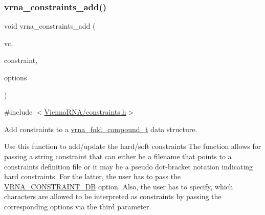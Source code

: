 \subsubsection{\texorpdfstring{vrna\+\_\+constraints\+\_\+add()}{vrna\_constraints\_add()}}
{\footnotesize\ttfamily void vrna\+\_\+constraints\+\_\+add (\begin{DoxyParamCaption}\item[{\mbox{\hyperlink{group__fold__compound_ga1b0cef17fd40466cef5968eaeeff6166}{vrna\+\_\+fold\+\_\+compound\+\_\+t}} $\ast$}]{vc,  }\item[{const char $\ast$}]{constraint,  }\item[{unsigned int}]{options }\end{DoxyParamCaption})}



{\ttfamily \#include $<$\mbox{\hyperlink{constraints_8h}{Vienna\+R\+N\+A/constraints.\+h}}$>$}



Add constraints to a \mbox{\hyperlink{group__fold__compound_ga1b0cef17fd40466cef5968eaeeff6166}{vrna\+\_\+fold\+\_\+compound\+\_\+t}} data structure. 

Use this function to add/update the hard/soft constraints The function allows for passing a string \textquotesingle{}constraint\textquotesingle{} that can either be a filename that points to a constraints definition file or it may be a pseudo dot-\/bracket notation indicating hard constraints. For the latter, the user has to pass the \mbox{\hyperlink{group__hard__constraints_ga4bfc2f15c4f261c62a11af9d2aa80c90}{V\+R\+N\+A\+\_\+\+C\+O\+N\+S\+T\+R\+A\+I\+N\+T\+\_\+\+DB}} option. Also, the user has to specify, which characters are allowed to be interpreted as constraints by passing the corresponding options via the third parameter.

